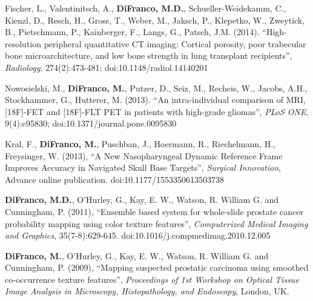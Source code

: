 \documentclass[line,a4paper]{resume}
\begin{document}
\begin{resume}
\begin{minipage}{\textwidth}
	\end{minipage}
	\begin{minipage}{\textwidth}
	Fischer, L., Valentinitsch, A., \textbf{DiFranco, M.D.}, Schueller-Weidekamm, C., Kienzl, D., Resch, H., Gross, T., Weber, M., Jaksch, P., Klepetko, W., Zweytick, B., Pietschmann, P., Kainberger, F., Langs, G., Patsch, J.M. (2014). ``High-resolution peripheral quantitative CT imaging: Cortical porosity, poor trabecular bone microarchitecture, and low bone strength in lung transplant recipients'', \emph{Radiology}, 274(2):473-481; doi:10.1148/radiol.14140201\\[2mm]
	\end{minipage}
	\begin{minipage}{\textwidth}
	Nowosielski, M., \textbf{DiFranco, M.}, Putzer, D., Seiz, M., Recheis, W., Jacobs, A.H., Stockhammer, G., Hutterer, M. (2013). ``An intra-individual comparison of MRI, [18F]-FET and [18F]-FLT PET in patients with high-grade gliomas'', \emph{PLoS ONE}, 9(4):e95830; doi:10.1371/journal.pone.0095830\\[2mm]
	\end{minipage}
	\begin{minipage}{\textwidth}
	Kral, F., \textbf{DiFranco, M.}, Puschban, J., Hoermann, R., Riechelmann, H., Freysinger, W. (2013), ``A New Nasopharyngeal Dynamic Reference Frame Improves Accuracy in Navigated Skull Base Targets'', \emph{Surgical Innovation}, Advance online publication. doi:10.1177/1553350613503738\\[2mm]
	\end{minipage}
	\begin{minipage}{\textwidth}
	\textbf{DiFranco, M.D.}, O'Hurley, G., Kay, E. W., Watson, R. William G. and Cunningham, P. (2011), ``Ensemble based system for whole-slide prostate cancer probability mapping using color texture features'', \emph{Computerized Medical Imaging and Graphics}, 35(7-8):629-645. doi:10.1016/j.compmedimag.2010.12.005\\[2mm]
	\end{minipage}
	\begin{minipage}{\textwidth}
	\textbf{DiFranco, M.}, O'Hurley, G., Kay, E. W., Watson, R. William G. and Cunningham, P. (2009), ``Mapping suspected prostatic carcinoma using smoothed co-occurrence texture features'', \emph{Proceedings of 1st Workshop on Optical Tissue Image Analysis in Microscopy, Histopathology, and Endoscopy}, London, UK. \\[2mm]
	\end{minipage}
	\begin{minipage}{\textwidth}

\end{minipage}
\end{resume}
\end{document}
